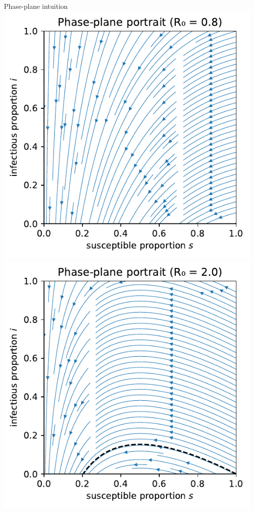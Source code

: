 \documentclass[14pt,aspectratio=169]{beamer}
\begin{document}
\begin{frame}{Phase-plane intuition}
    \centering
  \includegraphics{PhasePlane_R0_0.8.pdf}\hfill
  \includegraphics{PhasePlane_R0_2.0.pdf}

\end{frame}
\end{document}
